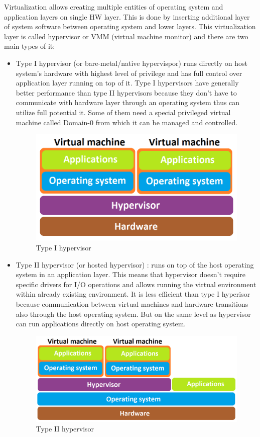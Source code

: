 Virtualization allows creating multiple entities of operating system and application layers on single HW layer. This is done by inserting additional layer of system software between operating system and lower layers. This virtualization layer is called hypervisor or VMM (virtual machine monitor) and there are two main types of it:
\begin{itemize}
\item Type I hypervisor (or bare-metal/native hypervispor) \label{type_i_hyp} runs directly on host system's hardware with highest level of privilege and has full control over application layer running on top of it. Type I hypervisors have generally better performance than type II hypervisors because they don't have to communicate with hardware layer through an operating system thus can utilize full potential it. Some of them need a special privileged virtual machine called Domain-0 from which it can be managed and controlled.

\begin{figure}[H]
\centering
\includegraphics[scale=0.4]{hyp-type-I.png}
\caption{Type I hypervisor}
\end{figure}

\item Type II hypervisor (or hosted hypervisor) \label{type_ii_hyp}: runs on top of the host operating system in an application layer. This means that hypervisor doesn't require specific drivers for I/O operations and allows running the virtual environment within already existing environment. It is less efficient than type I hyperisor because communication between virtual machines and hardware transitions also through the host operating system. But on the same level as hypervisor can run applications directly on host operating system.

\begin{figure}[H]
\centering
\includegraphics[scale=0.4]{hyp-type-II.png}
\caption{Type II hypervisor}
\end{figure}


\end{itemize}
